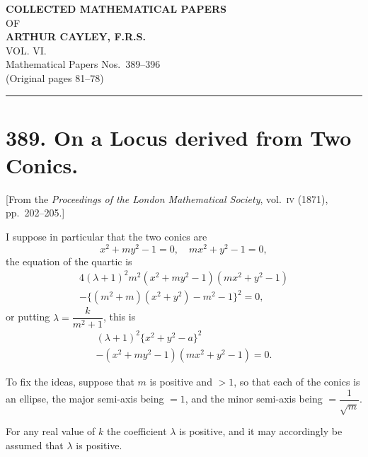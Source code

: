 \documentclass[11pt,a4paper]{article}
\theoremstyle{plain}
\begin{document}
\begin{center}
{\LARGE\bfseries COLLECTED MATHEMATICAL PAPERS}\\[6pt]
{\Large OF}\\[6pt]
{\LARGE\bfseries ARTHUR CAYLEY, F.R.S.}\\[12pt]
{\large VOL. VI.}\\[24pt]
{\large Mathematical Papers Nos.~389--396}\\[6pt]
{\normalsize (Original pages 81--78)}
\end{center}

\vspace{24pt}
\hrule
\vspace{24pt}

\section*{389. On a Locus derived from Two Conics.}
\label{sec:389}
\begin{center}
[From the \textit{Proceedings of the London Mathematical Society}, vol.~\textsc{iv} (1871), \mbox{pp.~202--205}.]
\end{center}

\setcounter{equation}{0}

I suppose in particular that the two conics are
\begin{equation}
x^2 + my^2 - 1 = 0, \quad mx^2 + y^2 - 1 = 0,
\end{equation}
the equation of the quartic is
\begin{multline}
4(\lambda + 1)^2 m^2 (x^2 + my^2 - 1)(mx^2 + y^2 - 1) \\
- \{(m^2 + m)(x^2 + y^2) - m^2 - 1\}^2 = 0,
\end{multline}
or putting $\lambda = \dfrac{k}{m^2+1}$, this is
\begin{multline}
(\lambda + 1)^2 \{x^2 + y^2 - a\}^2 \\
- (x^2 + my^2 - 1)(mx^2 + y^2 - 1) = 0.
\end{multline}

To fix the ideas, suppose that $m$ is positive and $> 1$, so that each of the conics is an ellipse, the major semi-axis being $=1$, and the minor semi-axis being $= \dfrac{1}{\sqrt{m}}$.

For any real value of $k$ the coefficient $\lambda$ is positive, and it may accordingly be assumed that $\lambda$ is positive.
\end{document}
